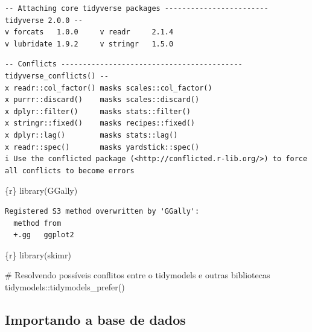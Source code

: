 \documentclass[
  letterpaper,
  DIV=11,
  numbers=noendperiod,
  oneside]{scrartcl}
\newenvironment{Shaded}{\begin{snugshade}}{\end{snugshade}}
\newcommand{\CommentTok}[1]{\textcolor[rgb]{0.37,0.37,0.37}{#1}}
\newcommand{\FunctionTok}[1]{\textcolor[rgb]{0.28,0.35,0.67}{#1}}
\newcommand{\InformationTok}[1]{\textcolor[rgb]{0.37,0.37,0.37}{#1}}
\newcommand{\NormalTok}[1]{\textcolor[rgb]{0.00,0.23,0.31}{#1}}
\newcommand{\SpecialCharTok}[1]{\textcolor[rgb]{0.37,0.37,0.37}{#1}}
\begin{document}
\begin{verbatim}
-- Attaching core tidyverse packages ------------------------ tidyverse 2.0.0 --
v forcats   1.0.0     v readr     2.1.4
v lubridate 1.9.2     v stringr   1.5.0
\end{verbatim}

\begin{verbatim}
-- Conflicts ------------------------------------------ tidyverse_conflicts() --
x readr::col_factor() masks scales::col_factor()
x purrr::discard()    masks scales::discard()
x dplyr::filter()     masks stats::filter()
x stringr::fixed()    masks recipes::fixed()
x dplyr::lag()        masks stats::lag()
x readr::spec()       masks yardstick::spec()
i Use the conflicted package (<http://conflicted.r-lib.org/>) to force all conflicts to become errors
\end{verbatim}

\begin{Shaded}
\begin{Highlighting}[]
\InformationTok{\textasciigrave{}\textasciigrave{}\textasciigrave{}\{r\}}
\FunctionTok{library}\NormalTok{(GGally)}
\InformationTok{\textasciigrave{}\textasciigrave{}\textasciigrave{}}
\end{Highlighting}
\end{Shaded}

\begin{verbatim}
Registered S3 method overwritten by 'GGally':
  method from   
  +.gg   ggplot2
\end{verbatim}

\begin{Shaded}
\begin{Highlighting}[]
\InformationTok{\textasciigrave{}\textasciigrave{}\textasciigrave{}\{r\}}
\FunctionTok{library}\NormalTok{(skimr)}

\CommentTok{\# Resolvendo possíveis conflitos entre o tidymodels e outras bibliotecas}
\NormalTok{tidymodels}\SpecialCharTok{::}\FunctionTok{tidymodels\_prefer}\NormalTok{()}
\InformationTok{\textasciigrave{}\textasciigrave{}\textasciigrave{}}
\end{Highlighting}
\end{Shaded}

\hypertarget{importando-a-base-de-dados}{%
\subsection{Importando a base de
dados}\label{importando-a-base-de-dados}}
\end{document}
